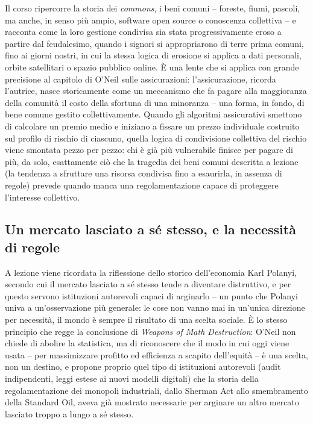 \documentclass[a4paper,11pt]{article}
\begin{document}
Il corso ripercorre la storia dei \emph{commons}, i beni comuni -- foreste, fiumi, pascoli, ma anche, in senso più ampio, software open source o conoscenza collettiva -- e racconta come la loro gestione condivisa sia stata progressivamente eroso a partire dal feudalesimo, quando i signori si appropriarono di terre prima comuni, fino ai giorni nostri, in cui la stessa logica di erosione si applica a dati personali, orbite satellitari o spazio pubblico online. È una lente che si applica con grande precisione al capitolo di O'Neil sulle assicurazioni: l'assicurazione, ricorda l'autrice, nasce storicamente come un meccanismo che fa pagare alla maggioranza della comunità il costo della sfortuna di una minoranza -- una forma, in fondo, di bene comune gestito collettivamente. Quando gli algoritmi assicurativi smettono di calcolare un premio medio e iniziano a fissare un prezzo individuale costruito sul profilo di rischio di ciascuno, quella logica di condivisione collettiva del rischio viene smontata pezzo per pezzo: chi è già più vulnerabile finisce per pagare di più, da solo, esattamente ciò che la tragedia dei beni comuni descritta a lezione (la tendenza a sfruttare una risorsa condivisa fino a esaurirla, in assenza di regole) prevede quando manca una regolamentazione capace di proteggere l'interesse collettivo.

\subsection{Un mercato lasciato a sé stesso, e la necessità di regole}

A lezione viene ricordata la riflessione dello storico dell'economia Karl Polanyi, secondo cui il mercato lasciato a sé stesso tende a diventare distruttivo, e per questo servono istituzioni autorevoli capaci di arginarlo -- un punto che Polanyi univa a un'osservazione più generale: le cose non vanno mai in un'unica direzione per necessità, il mondo è sempre il risultato di una scelta sociale. È lo stesso principio che regge la conclusione di \emph{Weapons of Math Destruction}: O'Neil non chiede di abolire la statistica, ma di riconoscere che il modo in cui oggi viene usata -- per massimizzare profitto ed efficienza a scapito dell'equità -- è una scelta, non un destino, e propone proprio quel tipo di istituzioni autorevoli (audit indipendenti, leggi estese ai nuovi modelli digitali) che la storia della regolamentazione dei monopoli industriali, dallo Sherman Act allo smembramento della Standard Oil, aveva già mostrato necessarie per arginare un altro mercato lasciato troppo a lungo a sé stesso.
\end{document}
